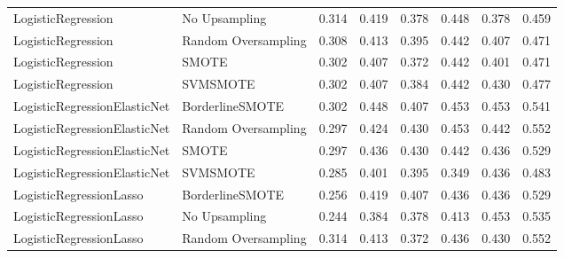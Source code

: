 \begin{tabular}{llllllll}
          LogisticRegression &       No Upsampling &     0.314 &                     0.419 &                 0.378 &                  0.448 &                                   0.378 &     0.459 \\
          LogisticRegression & Random Oversampling &     0.308 &                     0.413 &                 0.395 &                  0.442 &                                   0.407 &     0.471 \\
          LogisticRegression &               SMOTE &     0.302 &                     0.407 &                 0.372 &                  0.442 &                                   0.401 &     0.471 \\
          LogisticRegression &            SVMSMOTE &     0.302 &                     0.407 &                 0.384 &                  0.442 &                                   0.430 &     0.477 \\
LogisticRegressionElasticNet &     BorderlineSMOTE &     0.302 &                     0.448 &                 0.407 &                  0.453 &                                   0.453 &     0.541 \\
LogisticRegressionElasticNet & Random Oversampling &     0.297 &                     0.424 &                 0.430 &                  0.453 &                                   0.442 &     0.552 \\
LogisticRegressionElasticNet &               SMOTE &     0.297 &                     0.436 &                 0.430 &                  0.442 &                                   0.436 &     0.529 \\
LogisticRegressionElasticNet &            SVMSMOTE &     0.285 &                     0.401 &                 0.395 &                  0.349 &                                   0.436 &     0.483 \\
     LogisticRegressionLasso &     BorderlineSMOTE &     0.256 &                     0.419 &                 0.407 &                  0.436 &                                   0.436 &     0.529 \\
     LogisticRegressionLasso &       No Upsampling &     0.244 &                     0.384 &                 0.378 &                  0.413 &                                   0.453 &     0.535 \\
     LogisticRegressionLasso & Random Oversampling &     0.314 &                     0.413 &                 0.372 &                  0.436 &                                   0.430 &     0.552 \\

\end{tabular}
